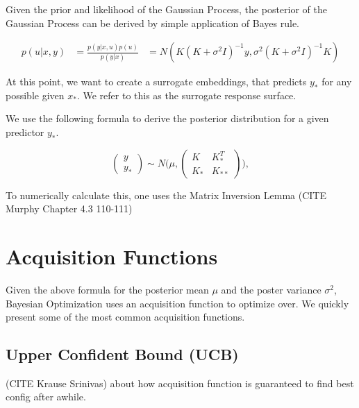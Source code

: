 
Given the prior and likelihood of the Gaussian Process, the posterior of the Gaussian Process can be derived by simple application of Bayes rule.

\begin{align}
p(u | x, y) &= \frac{ p(y | x, u) p(u) }{p(y | x)}
& = N( K(K +\sigma^2 I)^{-1}y, \sigma^2 (K + \sigma^2 I)^{-1} K )
\end{align}

At this point, we want to create a surrogate embeddings, that predicts $y_*$ for any possible given $x_*$. 
We refer to this as the surrogate response surface.

We use the following formula to derive the posterior distribution for a given predictor $y_*$.

\begin{equation}
\begin{pmatrix} y \\
y_* \end{pmatrix} \sim N\Biggl(\mu,\begin{pmatrix} K & K^T_*\\
 K_* & K_{**} \end{pmatrix}\Biggr),
\end{equation}

To numerically calculate this, one uses the Matrix Inversion Lemma (CITE Murphy Chapter 4.3 110-111)


\section{Acquisition Functions}

Given the above formula for the posterior mean $\mu$ and the poster variance $\sigma^2$, Bayesian Optimization uses an acquisition function to optimize over.
We quickly present some of the most common acquisition functions.


\subsection{Upper Confident Bound (UCB)}
(CITE Krause Srinivas) about how acquisition function is guaranteed to find best config after awhile.

